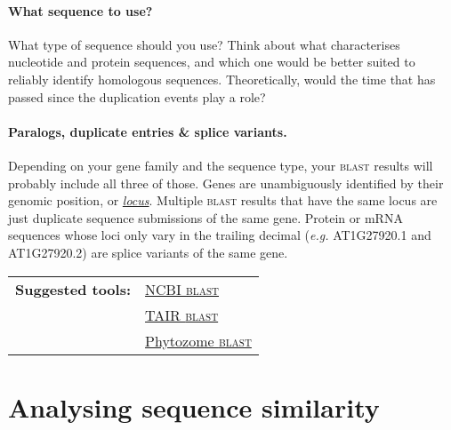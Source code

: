 \documentclass[11pt]{article}
\begin{document}
	\paragraph*{What sequence to use?} 
	What type of sequence should you use? Think about what characterises nucleotide and protein sequences, and which one would be better suited to reliably identify homologous sequences. Theoretically, would the time that has passed since the duplication events play a role?
	
	\paragraph*{Paralogs, duplicate entries \& splice variants.} 
	Depending on your gene family and the sequence type, your \textsc{blast} results will probably include all three of those. 
	Genes are unambiguously identified by their genomic position, or \href{https://www.arabidopsis.org/portals/nomenclature/guidelines.jsp#locus}{\textit{locus}}.
	Multiple \textsc{blast} results that have the same locus are just duplicate sequence submissions of the same gene. Protein or mRNA sequences whose loci only vary in the trailing decimal (\textit{e.g.} AT1G27920.1 and AT1G27920.2) are splice variants of the same gene.
	
	\vspace*{\baselineskip}
	
		\noindent\begin{tabular}{@{}ll}
		\textbf{Suggested tools:}	& \href{https://blast.ncbi.nlm.nih.gov/Blast.cgi}{NCBI \textsc{blast}} \\ 
		&  \href{https://www.arabidopsis.org/Blast/}{TAIR \textsc{blast}} \\ 
		&  \href{https://phytozome.jgi.doe.gov/pz/portal.html#!search?show=BLAST}{Phytozome \textsc{blast}}\\ 
		\end{tabular} 
	
	\section{Analysing sequence similarity\label{sec:phylo}}
	
\end{document}

